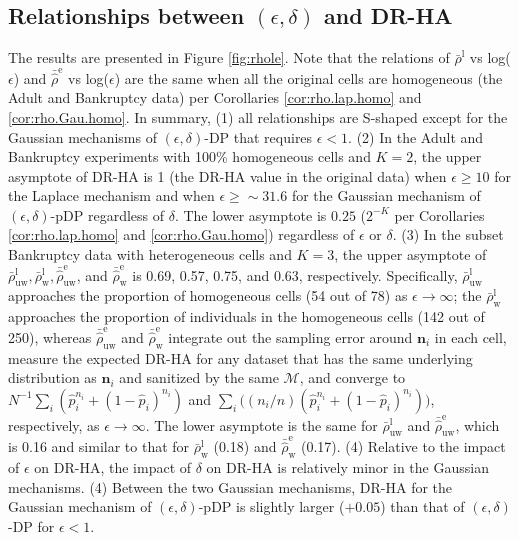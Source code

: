 \documentclass[10pt,journal,compsoc]{IEEEtran}
\newcommand{\M}{\mathcal{M}}
\newcommand{\n}{\mathbf{n}}
\begin{document}
\vspace{-9pt} \subsection{Relationships between $(\epsilon,\delta)$ and DR-HA}\label{sec:results}\vspace{-4pt}
The results are presented in Figure \ref{fig:rhole}. Note that the relations of $\bar{\rho}^{\text{l}}$ vs log($\epsilon$) and $\bar{\hat{\rho}}^{\text{e}}$ vs log($\epsilon$) are the same when all the original cells are homogeneous (the Adult and Bankruptcy data) per Corollaries \ref{cor:rho.lap.homo} and \ref{cor:rho.Gau.homo}.  In summary,  (1) all relationships are S-shaped except for the Gaussian mechanisms of $(\epsilon,\delta)$-DP that requires $\epsilon<1$. (2)  In the Adult and Bankruptcy  experiments with 100\% homogeneous cells and $K\!=\!2$, the upper asymptote of DR-HA is 1 (the DR-HA value in the original data) when $\epsilon\!\ge\!10$ for the Laplace  mechanism and  when $\epsilon\!\ge\sim\!31.6$ for the Gaussian mechanism of $(\epsilon,\delta)$-pDP regardless of  $\delta$. The lower asymptote is $0.25$ ($2^{-K}$ per Corollaries \ref{cor:rho.lap.homo} and \ref{cor:rho.Gau.homo}) regardless of $\epsilon$ or $\delta$. (3) In the subset Bankruptcy data with  heterogeneous cells and $K\!=\!3$, the upper asymptote of $\bar{\rho}^{\text{l}}_{\text{uw}}, \bar{\rho}^{\text{l}}_{\text{w}}, \bar{\hat{\rho}}^{\text{e}}_{\text{uw}}$,  and $\bar{\hat{\rho}}^{\text{e}}_{\text{w}}$ is 0.69, 0.57, 0.75, and 0.63, respectively. Specifically, $\bar{\rho}^{\text{l}}_{\text{uw}}$ approaches the proportion of homogeneous cells (54 out of 78) as $\epsilon\rightarrow\infty$; the $\bar{\rho}^{\text{l}}_{\text{w}}$ approaches the proportion of individuals in the homogeneous cells (142 out of 250), whereas $\bar{\hat{\rho}}^{\text{e}}_{\text{uw}}$ and $\bar{\hat{\rho}}^{\text{e}}_{\text{w}}$  integrate out the sampling error around $\n_i$ in each cell, measure the expected DR-HA for any dataset that has the same underlying distribution as $\n_i$ and sanitized by the same $\M$, and converge to $N^{-1} \sum_i (\hat{p}_i^{n_i}+(1-\hat{p}_i)^{n_i})$ and $\sum_i\big((n_i/n) (\hat{p}_i^{n_i}+(1-\hat{p}_i)^{n_i})\big)$, respectively, as $\epsilon\rightarrow\infty$. The lower asymptote is the same for $\bar{\rho}^{\text{l}}_{\text{uw}}$ and $\bar{\hat{\rho}}^{\text{e}}_{\text{uw}}$, which is 0.16 and similar to that for  $\bar{\rho}^{\text{l}}_{\text{w}}$ (0.18) and $\bar{\hat{\rho}}^{\text{e}}_{\text{w}}$ (0.17).  (4) Relative to the impact of $\epsilon$ on DR-HA, the impact of $\delta$ on DR-HA is relatively minor in the Gaussian mechanisms. (4) Between the two Gaussian mechanisms, DR-HA for the Gaussian mechanism of $(\epsilon,\delta)$-pDP is slightly larger ($+0.05$) than that of $(\epsilon,\delta)$-DP for $\epsilon<1$.  
\end{document}
